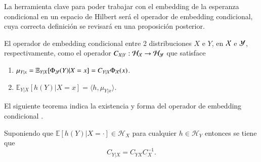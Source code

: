 La herramienta clave para poder trabajar con el embedding de la esperanza condicional en un espacio de Hilbert será el operador de embedding condicional, cuya correcta definición se revisará en una proposición posterior.
\begin{defn}
    El operador de embedding condicional entre 2 distribuciones $X$ e $Y$, en $\mathcal{X}$ e $\mathcal{Y}$, respectivamente, como el operador $C_{X|Y} : \mathcal{H}_{\mathcal{X}} \to \mathcal{H}_{\mathcal{Y}}$ que satisface
    \begin{enumerate}
        \item $\mu_{Y|x} = \mathbb{E}_{Y|X}[\Phi_{\mathcal{Y}} (Y)|X=x] = C_{Y|X}\Phi_{\mathcal{X}} (x)$.
        \item $\mathbb{E}_{Y|X}[h(Y)|X=x] = \langle h, \mu_{Y|x} \rangle$.
    \end{enumerate}
\end{defn}
El siguiente teorema indica la existencia y forma del operador de embedding condicional \cite{Fukumizu2004DimensionalitySpaces, Song2009HilbertSystems}.
\begin{teo}
    Suponiendo que \( \mathbb{E}[h(Y)|X = \cdot] \in \mathcal{H}_X \) para cualquier \( h \in \mathcal{H}_Y \) entonces se tiene que
    \[ C_{Y|X} = C_{YX} C_{X}^{-1}.\]
\end{teo}

